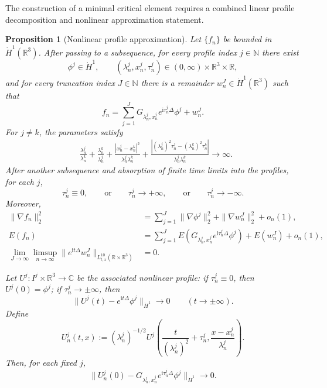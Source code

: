 \documentclass{interact}
\numberwithin{equation}{section}
\theoremstyle{plain}
\newtheorem{proposition}[theorem]{Proposition}
\theoremstyle{definition}
\theoremstyle{remark}
\newcommand{\R}{\mathbb R}
\newcommand{\C}{\mathbb C}
\newcommand{\ii}{\mathrm i}
\begin{document}
The construction of a minimal critical element requires a combined linear profile decomposition and nonlinear approximation statement.

\begin{proposition}[Nonlinear profile approximation]\label{prop:profile-package}
Let $\{f_n\}$ be bounded in $\dot H^1(\R^3)$. After passing to a subsequence, for every profile index $j\in\mathbb N$ there exist
\[
 \phi^j\in\dot H^1,
 \qquad
 (\lambda_n^j,x_n^j,\tau_n^j)\in(0,\infty)\times\R^3\times\R,
\]
and for every truncation index $J\in\mathbb N$ there is a remainder $w_n^J\in\dot H^1(\R^3)$ such that
\[
 f_n=\sum_{j=1}^J
 G_{\lambda_n^j,x_n^j}e^{\ii\tau_n^j\Delta}\phi^j+w_n^J.
\]
For $j\ne k$, the parameters satisfy
\begin{align}
 &\frac{\lambda_n^j}{\lambda_n^k}
 +\frac{\lambda_n^k}{\lambda_n^j}
 +\frac{|x_n^j-x_n^k|^2}{\lambda_n^j\lambda_n^k}
 +\frac{|(\lambda_n^j)^2\tau_n^j-(\lambda_n^k)^2\tau_n^k|}
 {\lambda_n^j\lambda_n^k}
 \longrightarrow\infty.
 \label{eq:profile-parameter-orthogonality}
\end{align}
After another subsequence and absorption of finite time limits into the profiles, for each $j$,
\begin{equation}\label{eq:profile-time-normalization}
 \tau_n^j\equiv0,
 \qquad\text{or}\qquad
 \tau_n^j\to+\infty,
 \qquad\text{or}\qquad
 \tau_n^j\to-\infty.
\end{equation}
Moreover,
\begin{align}
 \|\nabla f_n\|_2^2
 &=\sum_{j=1}^J\|\nabla\phi^j\|_2^2
   +\|\nabla w_n^J\|_2^2+o_n(1),
 \label{eq:profile-kinetic-decoupling}\\
 E(f_n)
 &=\sum_{j=1}^J
 E\!\left(G_{\lambda_n^j,x_n^j}
 e^{\ii\tau_n^j\Delta}\phi^j\right)
 +E(w_n^J)+o_n(1),
 \label{eq:profile-energy-decoupling}\\
 \lim_{J\to\infty}\limsup_{n\to\infty}
 \|e^{\ii t\Delta}w_n^J\|_{L_{t,x}^{10}(\R\times\R^3)}&=0.
 \label{eq:profile-linear-remainder-small}
\end{align}

Let $U^j:I^j\times\R^3\to\C$ be the associated nonlinear profile: if $\tau_n^j\equiv0$, then $U^j(0)=\phi^j$; if $\tau_n^j\to\pm\infty$, then
\begin{equation}\label{eq:nonlinear-profile-wave-operator}
 \|U^j(t)-e^{\ii t\Delta}\phi^j\|_{\dot H^1}
 \longrightarrow0
 \qquad(t\to\pm\infty).
\end{equation}
Define
\[
 U_n^j(t,x)
 :=(\lambda_n^j)^{-1/2}
 U^j\left(\frac{t}{(\lambda_n^j)^2}+\tau_n^j,
 \frac{x-x_n^j}{\lambda_n^j}\right).
\]
Then, for each fixed $j$,
\begin{equation}\label{eq:nonlinear-profile-initial-agreement}
 \|U_n^j(0)-G_{\lambda_n^j,x_n^j}
 e^{\ii\tau_n^j\Delta}\phi^j\|_{\dot H^1}
 \longrightarrow0.
\end{equation}


\end{proposition}
\end{document}
